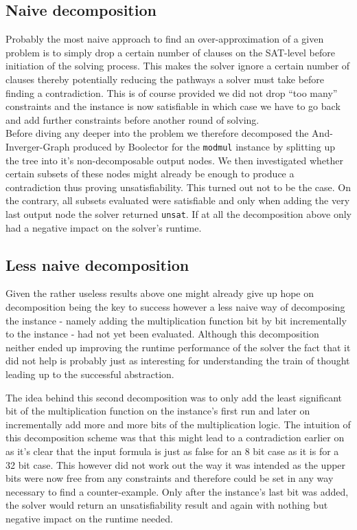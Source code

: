 \subsection{Naive decomposition}
Probably the most naive approach to find an over-approximation of a given problem is to simply drop a certain number of clauses on the SAT-level before initiation of the solving process. This makes the solver ignore a certain number of clauses thereby potentially reducing the pathways a solver must take before finding a contradiction. This is of course provided we did not drop \enquote{too many} constraints and the instance is now satisfiable in which case we have to go back and add further constraints before another round of solving.\\
Before diving any deeper into the problem we therefore decomposed the And-Inverger-Graph \cite{Biere-FMV-TR-11-2-AIGER}  produced by Boolector for the \texttt{modmul} instance by splitting up the tree into it's non-decomposable output nodes. We then investigated whether certain subsets of these nodes might already be enough to produce a contradiction thus proving unsatisfiability. This turned out not to be the case. On the contrary, all subsets evaluated were satisfiable and only when adding the very last output node the solver returned \texttt{unsat}. If at all the decomposition above only had a negative impact on the solver's runtime.

\subsection{Less naive decomposition}

Given the rather useless results above one might already give up hope on decomposition being the key to success however a less naive way of decomposing the instance - namely adding the multiplication function bit by bit incrementally to the instance - had not yet been evaluated. Although this decomposition neither ended up improving the runtime performance of the solver the fact that it did not help is probably just as interesting for understanding the train of thought leading up to the successful abstraction. 
\par
The idea behind this second decomposition was to only add the least significant bit of the multiplication function on the instance's first run and later on incrementally add more and more bits of the multiplication logic. The intuition of this decomposition scheme was that this might lead to a contradiction earlier on as it's clear that the input formula is just as false for an 8 bit case as it is for a 32 bit case. This however did not work out the way it was intended as the upper bits were now free from any constraints and therefore could be set in any way necessary to find a counter-example. Only after the instance's last bit was added, the solver would return an unsatisfiability result and again with nothing but negative impact on the runtime needed.


